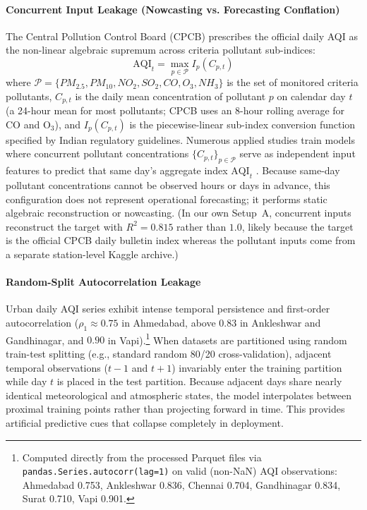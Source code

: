 \paragraph{Concurrent Input Leakage (Nowcasting vs. Forecasting Conflation)}
The Central Pollution Control Board (CPCB) prescribes the official daily AQI as the non-linear algebraic supremum across criteria pollutant sub-indices:
\begin{equation}
  \text{AQI}_t = \max_{p \in \mathcal{P}} I_p(C_{p,t})
  \label{eq:cpcb_aqi}
\end{equation}
where $\mathcal{P} = \{PM_{2.5}, PM_{10}, NO_2, SO_2, CO, O_3, NH_3\}$ is the set of monitored criteria pollutants, $C_{p,t}$ is the daily mean concentration of pollutant $p$ on calendar day $t$ (a 24-hour mean for most pollutants; CPCB uses an 8-hour rolling average for CO and O$_3$), and $I_p(C_{p,t})$ is the piecewise-linear sub-index conversion function specified by Indian regulatory guidelines. Numerous applied studies train models where concurrent pollutant concentrations $\{C_{p,t}\}_{p \in \mathcal{P}}$ serve as independent input features to predict that same day's aggregate index $\text{AQI}_t$ \cite{sidhu2024}\cite{mishra2025}\cite{jayapradha2025}\cite{chauhan2026}. Because same-day pollutant concentrations cannot be observed hours or days in advance, this configuration does not represent operational forecasting; it performs static algebraic reconstruction or nowcasting. (In our own Setup~A, concurrent inputs reconstruct the target with $R^2 = 0.815$ rather than $1.0$, likely because the target is the official CPCB daily bulletin index whereas the pollutant inputs come from a separate station-level Kaggle archive.)

\paragraph{Random-Split Autocorrelation Leakage}
Urban daily AQI series exhibit intense temporal persistence and first-order autocorrelation ($\rho_1 \approx 0.75$ in Ahmedabad, above $0.83$ in Ankleshwar and Gandhinagar, and $0.90$ in Vapi).\footnote{Computed directly from the processed Parquet files via \texttt{pandas.Series.autocorr(lag=1)} on valid (non-NaN) AQI observations: Ahmedabad 0.753, Ankleshwar 0.836, Chennai 0.704, Gandhinagar 0.834, Surat 0.710, Vapi 0.901.} When datasets are partitioned using random train-test splitting (e.g., standard random 80/20 cross-validation), adjacent temporal observations ($t-1$ and $t+1$) invariably enter the training partition while day $t$ is placed in the test partition. Because adjacent days share nearly identical meteorological and atmospheric states, the model interpolates between proximal training points rather than projecting forward in time. This provides artificial predictive cues that collapse completely in deployment.

